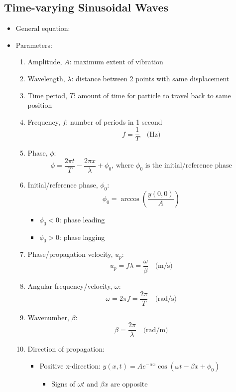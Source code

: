 \documentclass[a4paper]{article}
\begin{document}
\subsection{Time-varying Sinusoidal Waves}
\begin{itemize}
    \item General equation: 
    \begin{center}
    \end{center}
    \item Parameters:
    \begin{enumerate}
    \item Amplitude, $A$: maximum extent of vibration
    \item Wavelength, $\lambda$: distance between 2 points with same displacement
    \item Time period, $T$: amount of time for particle to travel back to same position
    \item Frequency, $f$: number of periods in 1 second $$f = \frac{1}{T} \quad\text{(Hz)}$$
    \item Phase, $\phi$:
    $$\phi = \frac{2\pi t}{T}-\frac{2\pi x}{\lambda}+\phi_{0}\text{, where }\phi_{0}\text{ is the initial/reference phase}$$
    \item Initial/reference phase, $\phi_{0}$:
    $$\phi_{0} = \arccos{\left(\frac{y(0, 0)}{A}\right)}$$
    \begin{itemize}[label=$\circ$]
        \item $\phi_{0}<0$: phase leading
        \item $\phi_{0}>0$: phase lagging
    \end{itemize}
    \item Phase/propagation velocity, $u_{p}$:
    $$u_{p} = f\lambda =  \frac{\omega}{\beta}\quad\text{(m/s)}$$
    \item Angular frequency/velocity, $\omega$:
    $$\omega = 2\pi f = \frac{2\pi}{T}\quad\text{(rad/s)}$$
    \item Wavenumber, $\beta$:
    $$\beta = \frac{2\pi}{\lambda}\quad\text{(rad/m)}$$
    \item Direction of propagation:
     \begin{itemize}[label=$\circ$]
        \item Positive x-direction: $y(x, t) = Ae^{-\alpha x}\cos{\left(\omega t -\beta x + \phi_{0}\right)}$
        \begin{itemize}[label=\tiny$\blacksquare$]
            \item Signs of $\omega t$ and $\beta x$ are opposite

\end{itemize}
\end{itemize}
\end{enumerate}
\end{itemize}
\end{document}
